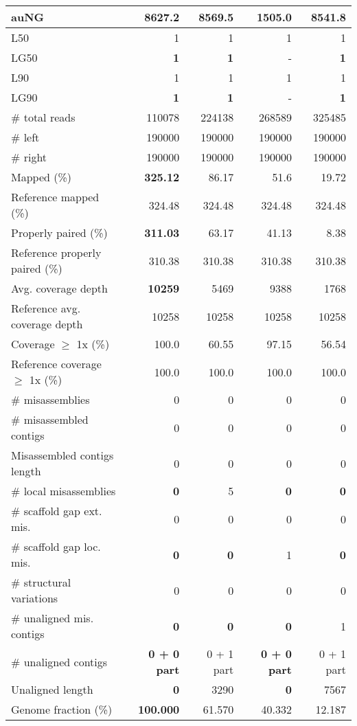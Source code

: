 \documentclass[12pt,a4paper]{article}
\begin{document}
\begin{table}[ht]
\begin{center}
\begin{tabular}{|l*{4}{|r}|}
auNG & {\bf 8627.2} & 8569.5 & 1505.0 & 8541.8 \\ \hline
L50 & 1 & 1 & 1 & 1 \\ \hline
LG50 & {\bf 1} & {\bf 1} & - & {\bf 1} \\ \hline
L90 & 1 & 1 & 1 & 1 \\ \hline
LG90 & {\bf 1} & {\bf 1} & - & {\bf 1} \\ \hline
\# total reads & 110078 & 224138 & 268589 & 325485 \\ \hline
\# left & 190000 & 190000 & 190000 & 190000 \\ \hline
\# right & 190000 & 190000 & 190000 & 190000 \\ \hline
Mapped (\%) & {\bf 325.12} & 86.17 & 51.6 & 19.72 \\ \hline
Reference mapped (\%) & 324.48 & 324.48 & 324.48 & 324.48 \\ \hline
Properly paired (\%) & {\bf 311.03} & 63.17 & 41.13 & 8.38 \\ \hline
Reference properly paired (\%) & 310.38 & 310.38 & 310.38 & 310.38 \\ \hline
Avg. coverage depth & {\bf 10259} & 5469 & 9388 & 1768 \\ \hline
Reference avg. coverage depth & 10258 & 10258 & 10258 & 10258 \\ \hline
Coverage $\geq$ 1x (\%) & 100.0 & 60.55 & 97.15 & 56.54 \\ \hline
Reference coverage $\geq$ 1x (\%) & 100.0 & 100.0 & 100.0 & 100.0 \\ \hline
\# misassemblies & 0 & 0 & 0 & 0 \\ \hline
\# misassembled contigs & 0 & 0 & 0 & 0 \\ \hline
Misassembled contigs length & 0 & 0 & 0 & 0 \\ \hline
\# local misassemblies & {\bf 0} & 5 & {\bf 0} & {\bf 0} \\ \hline
\# scaffold gap ext. mis. & 0 & 0 & 0 & 0 \\ \hline
\# scaffold gap loc. mis. & {\bf 0} & {\bf 0} & 1 & {\bf 0} \\ \hline
\# structural variations & 0 & 0 & 0 & 0 \\ \hline
\# unaligned mis. contigs & {\bf 0} & {\bf 0} & {\bf 0} & 1 \\ \hline
\# unaligned contigs & {\bf 0 + 0 part} & 0 + 1 part & {\bf 0 + 0 part} & 0 + 1 part \\ \hline
Unaligned length & {\bf 0} & 3290 & {\bf 0} & 7567 \\ \hline
Genome fraction (\%) & {\bf 100.000} & 61.570 & 40.332 & 12.187 \\ \hline

\end{tabular}
\end{center}
\end{table}
\end{document}
